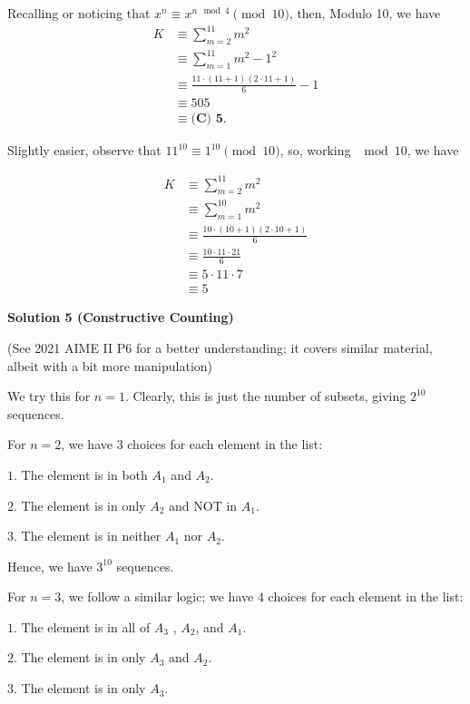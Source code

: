 \begin{enumerate}
 Recalling or noticing that  $x^n \equiv x^{n \mod 4} \pmod {10}$, then, Modulo 10, we have
 \begin{align*} K & \equiv \sum_{m = 2}^{11} m^2 \\ & \equiv \sum_{m = 1}^{11} m^2 - 1^2 \\ & \equiv \frac{11 \cdot \left( 11 + 1 \right) \left( 2 \cdot 11 + 1 \right)}{6} - 1\\ & \equiv 505 \\ & \equiv \boxed{\textbf{(C) 5}}  . \end{align*}


 Slightly easier, observe that $11^{10} \equiv 1^{10 }\pmod {10}$, so, working ${\mod 10}$, we have 

 
 \begin{align*} K & \equiv \sum_{m = 2}^{11} m^2 \\ & \equiv \sum_{m = 1}^{10} m^2 \\ & \equiv \frac{10 \cdot \left( 10 + 1 \right) \left( 2 \cdot 10 + 1 \right)}{6} \\ & \equiv \frac{10 \cdot 11 \cdot 21}{6} \\ & \equiv 5 \cdot 11 \cdot 7 \\ & \equiv \boxed{ 5} \end{align*}





\textbf{Solution 5 (Constructive Counting)}

(See 2021 AIME II P6 for a better understanding; it covers similar material, albeit with a bit more manipulation)

 
We try this for $n=1$. Clearly, this is just the number of subsets, giving $2^{10}$ sequences. 

 
For $n=2$, we have $3$ choices for each element in the list:

 $1$. The element is in both $A_1$ and $A_2$. 

 $2$. The element is in only $A_2$ and NOT in $A_1$. 

 $3$. The element is in neither $A_1$ nor $A_2$. 

 Hence, we have $3^{10}$ sequences.

 
For $n=3$, we follow a similar logic; we have $4$ choices for each element in the list:

 $1$. The element is in all of $A_3$ , $A_2$, and $A_1$.

 $2$. The element is in only $A_3$ and $A_2$.

 $3$. The element is in only $A_3$.


\end{enumerate}
